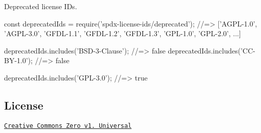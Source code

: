 Deprecated license I\+Ds.


\begin{DoxyCode}
const deprecatedIds = require('spdx-license-ids/deprecated');
//=> ['AGPL-1.0', 'AGPL-3.0', 'GFDL-1.1', 'GFDL-1.2', 'GFDL-1.3', 'GPL-1.0', 'GPL-2.0', ...]

deprecatedIds.includes('BSD-3-Clause'); //=> false
deprecatedIds.includes('CC-BY-1.0'); //=> false

deprecatedIds.includes('GPL-3.0'); //=> true
\end{DoxyCode}


\subsection*{License}

\href{https://creativecommons.org/publicdomain/zero/1.0/deed}{\tt Creative Commons Zero v1. Universal} 